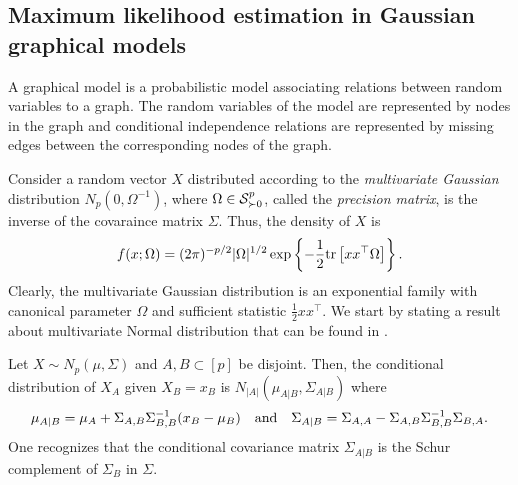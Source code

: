 \subsection{Maximum likelihood estimation in Gaussian graphical models}

A graphical model is a probabilistic model associating relations between random variables to a graph. The random variables of the model are represented by nodes in the graph and conditional independence relations are represented by missing edges between the corresponding nodes of the graph.

Consider a random vector $X$ distributed according to the \textit{multivariate Gaussian} distribution $N_p(0, \Omega^{-1})$, where $\Omega \in \S^p_{\succ 0}$, called the \textit{precision matrix}, is the inverse of the covaraince matrix $\Sigma$. Thus, the density of $X$ is
\begin{equation} \label{eq-density-gaussian}
    f(x; \Omega) = (2\pi)^{-p/2} |\Omega|^{1/2} \expfc{-\frac{1}{2} \trB{xx^\top \Omega} }.
\end{equation}
Clearly, the multivariate Gaussian distribution is an exponential family with canonical parameter $\Omega$ and sufficient statistic $\frac{1}{2}xx^\top$. We start by stating a result about multivariate Normal distribution that can be found in \cite[Proposition C.5]{lauritzen1996}. 

\begin{lemma} \label{lem-gaussian-cond}
    Let $X \sim N_p(\mu, \Sigma)$ and $A, B \subset [p]$ be disjoint. Then, the conditional distribution of $X_A$ given $X_B = x_B$ is $N_{|A|}(\mu_{A|B}, \Sigma_{A|B})$ where
    \begin{align*}
        \mu_{A|B} = \mu_A + \Sigma_{A,B}\Sigma^{-1}_{B,B}(x_B - \mu_B) && \t{and} && \Sigma_{A|B} = \Sigma_{A,A} - \Sigma_{A,B}\Sigma^{-1}_{B,B}\Sigma_{B,A}.
    \end{align*} 
    One recognizes that the conditional covariance matrix $\Sigma_{A|B}$ is the Schur complement of $\Sigma_B$ in $\Sigma$.
\end{lemma}

